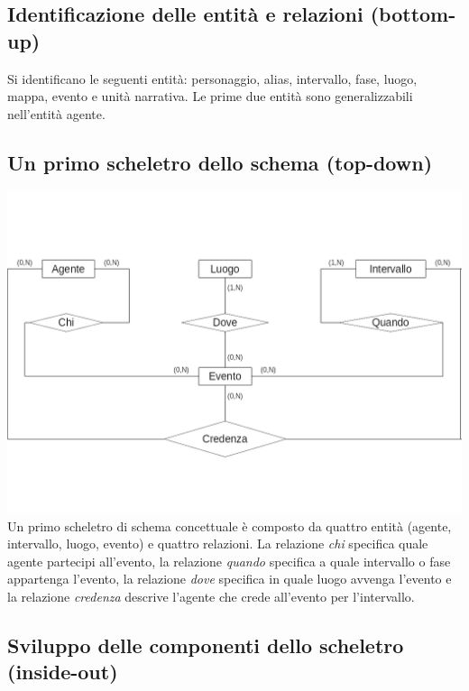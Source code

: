 \documentclass{article}
\begin{document}
\subsection{Identificazione delle entità e relazioni (bottom-up)}
Si identificano le seguenti entità: personaggio, alias, intervallo,
fase, luogo, mappa, evento e unità narrativa.
Le prime due entità sono generalizzabili nell'entità agente.
\subsection{Un primo scheletro dello schema (top-down)}
\includegraphics[width=\linewidth]{primo-scheletro.png}
Un primo scheletro di schema concettuale è composto da quattro entità (agente,
intervallo, luogo, evento) e quattro relazioni. La relazione \emph{chi}
specifica quale agente partecipi all'evento, la relazione \emph{quando}
specifica a quale intervallo o fase appartenga l'evento, la relazione
\emph{dove} specifica in quale luogo avvenga l'evento e la relazione
\emph{credenza} descrive l'agente che crede all'evento per l'intervallo.
\subsection{Sviluppo delle componenti dello scheletro (inside-out)}
\end{document}
